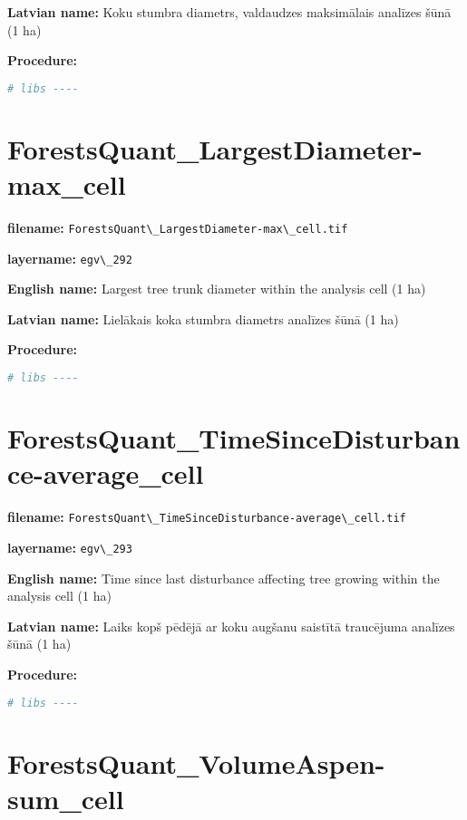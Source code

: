 \documentclass[
]{book}
\newcommand{\passthrough}[1]{#1}
\begin{document}
\textbf{Latvian name:} Koku stumbra diametrs, valdaudzes maksimālais analīzes šūnā (1 ha)

\textbf{Procedure:}

\begin{lstlisting}[language=R]
# libs ----
\end{lstlisting}

\section{ForestsQuant\_LargestDiameter-max\_cell}\label{ch06.292}

\textbf{filename:} \passthrough{\lstinline!ForestsQuant\_LargestDiameter-max\_cell.tif!}

\textbf{layername:} \passthrough{\lstinline!egv\_292!}

\textbf{English name:} Largest tree trunk diameter within the analysis cell (1 ha)

\textbf{Latvian name:} Lielākais koka stumbra diametrs analīzes šūnā (1 ha)

\textbf{Procedure:}

\begin{lstlisting}[language=R]
# libs ----
\end{lstlisting}

\section{ForestsQuant\_TimeSinceDisturbance-average\_cell}\label{ch06.293}

\textbf{filename:} \passthrough{\lstinline!ForestsQuant\_TimeSinceDisturbance-average\_cell.tif!}

\textbf{layername:} \passthrough{\lstinline!egv\_293!}

\textbf{English name:} Time since last disturbance affecting tree growing within the analysis cell (1 ha)

\textbf{Latvian name:} Laiks kopš pēdējā ar koku augšanu saistītā traucējuma analīzes šūnā (1 ha)

\textbf{Procedure:}

\begin{lstlisting}[language=R]
# libs ----
\end{lstlisting}

\section{ForestsQuant\_VolumeAspen-sum\_cell}\label{ch06.294}
\end{document}
